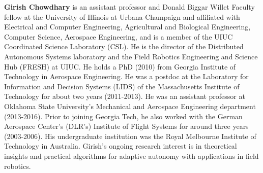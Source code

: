 \documentclass[letterpaper,12pt,peerreviewca,draftcls]{IEEEtran}
\begin{document}
\noindent \textbf{Girish Chowdhary} is an assistant professor and Donald Biggar Willet Faculty fellow at the University of Illinois at Urbana-Champaign and affiliated with Electrical and Computer Engineering, Agricultural and Biological Engineering, Computer Science, Aerospace Engineering, and is a member of the UIUC Coordinated Science Laboratory (CSL). He is the director of the Distributed Autonomous Systems laboratory and the Field Robotics Engineering and Science Hub (FRESH) at UIUC. He holds a PhD (2010) from Georgia Institute of Technology in Aerospace Engineering. He was a postdoc at the Laboratory for Information and Decision Systems (LIDS) of the Massachusetts Institute of Technology for about two years (2011-2013). He was an assistant professor at Oklahoma State University's Mechanical and Aerospace Engineering department (2013-2016). Prior to joining Georgia Tech, he also worked with the German Aerospace Center's (DLR's) Institute of Flight Systems for around three years (2003-2006). His undergraduate institution was the Royal Melbourne Institute of Technology in Australia. Girish's ongoing research interest is in theoretical insights and practical algorithms for adaptive autonomy with applications in field robotics.  
\end{document}
